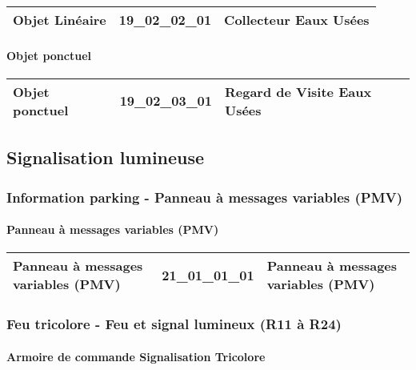\documentclass[12pt,titlepage,oneside]{book}
\begin{document}
\renewcommand{\arraystretch}{1.2}
\begin{supertabular}{|p{10cm}|c|p{15cm}|}
 Objet Linéaire & 19\_02\_02\_01 & Collecteur Eaux Usées\\
\hline
\end{supertabular}


\paragraph{Objet ponctuel}
\noindent
\vspace{\baselineskip}

\renewcommand{\arraystretch}{1.2}
\begin{supertabular}{|p{10cm}|c|p{15cm}|}
 Objet ponctuel & 19\_02\_03\_01 & Regard de Visite Eaux Usées\\
\hline
\end{supertabular}
\subsection{Signalisation lumineuse}
\subsubsection{\large Information parking - Panneau à messages variables (PMV)}
\paragraph{Panneau à messages variables (PMV)}
\noindent
\vspace{\baselineskip}

\renewcommand{\arraystretch}{1.2}
\begin{supertabular}{|p{10cm}|c|p{15cm}|}
 Panneau à messages variables (PMV) & 21\_01\_01\_01 & Panneau à messages variables (PMV)\\
\hline
\end{supertabular}

\subsubsection{\large Feu tricolore - Feu et signal lumineux (R11 à R24)}
\paragraph{Armoire de commande Signalisation Tricolore}
\noindent
\vspace{\baselineskip}
\end{document}
